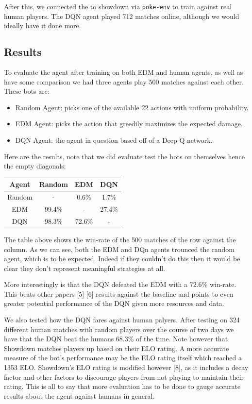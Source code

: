 \documentclass{article}
\begin{document}
After this, we connected the to showdown via \texttt{poke-env} to train against real human players. The DQN agent played 712 matches online, although we would ideally have it done more.

\subsection{Results}
To evaluate the agent after training on both EDM and human agents, as well as have some comparison we had three agents play 500 matches against each other. These bots are:
\begin{itemize}
  \item Random Agent: picks one of the available 22 actions with uniform probability.
  \item EDM Agent: picks the action that greedily maximizes the expected damage.
  \item DQN Agent: the agent in question based off of a Deep Q network.
\end{itemize}

Here are the results, note that we did evaluate test the bots on themselves hence the empty diagonals:
\begin{center}
  \begin{tabular}{||c c c c||} 
  \hline
  Agent & Random & EDM & DQN \\ [0.5ex] 
  \hline\hline
  Random & - & 0.6\% & 1.7\% \\ 
  \hline
  EDM & 99.4\% & - & 27.4\% \\
  \hline
  DQN & 98.3\% & 72.6\% & - \\
  \hline
 \end{tabular}
\end{center}

The table above shows the win-rate of the 500 matches of the row against the column. As we can see, both the EDM and DQn agents trounced the random agent, which is to be expected. Indeed if they couldn't do this then it would be clear they don't represent meaningful strategies at all.

More interestingly is that the DQN defeated the EDM with a 72.6\% win-rate. This beats other papers [5] [6] results against the baseline and points to even greater potential performance of the DQN given more resources and data.

We also tested how the DQN fares against human palyers. After testing on 324 different human matches with random players over the course of two days we have that the DQN beat the humans 68.3\% of the time. Note however that Showdown matches players up based on their ELO rating. A more accurate measure of the bot's performance may be the ELO rating itself which reached a 1353 ELO. Showdown's ELO rating is modified however [8], as it includes a decay factor and other factors to discourage players from not playing to maintain their rating. This is all to say that more evaluation has to be done to gauge accurate results about the agent against humans in general.
\end{document}
